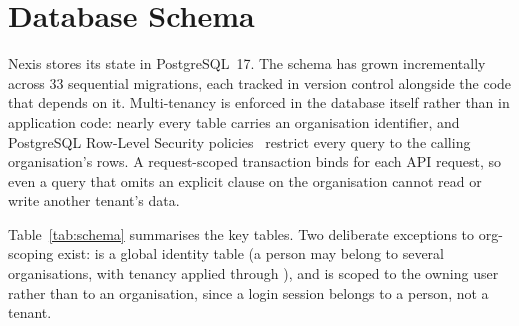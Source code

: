 \section{Database Schema}
\label{sec:schema}

Nexis stores its state in PostgreSQL~17. The schema has grown incrementally
across 33 sequential migrations, each tracked in version control alongside
the code that depends on it. Multi-tenancy is enforced in the database
itself rather than in application code: nearly every table carries an
organisation identifier, and PostgreSQL Row-Level Security
policies~\cite{pgrls} restrict every query to the calling organisation's
rows. A request-scoped transaction binds  for
each API request, so even a query that omits an explicit 
clause on the organisation cannot read or write another tenant's data.

Table~\ref{tab:schema} summarises the key tables. Two deliberate exceptions
to org-scoping exist:  is a global identity table (a person may
belong to several organisations, with tenancy applied through
), and  is scoped to the owning user
rather than to an organisation, since a login session belongs to a person,
not a tenant.

